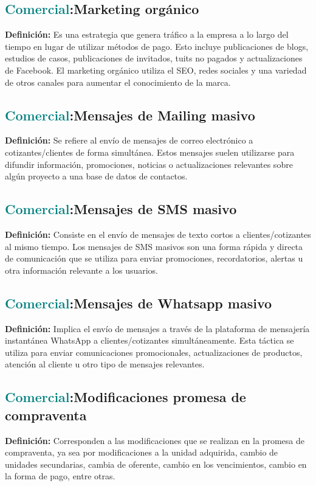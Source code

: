 \documentclass[12pt]{article}
\begin{document}
\subsection{\textcolor{teal}{Comercial}:{Marketing orgánico}}
\textbf{Definición:} Es una estrategia que genera tráfico a la empresa a lo largo del tiempo en lugar de utilizar métodos de pago. Esto incluye publicaciones de blogs, estudios de casos, publicaciones de invitados, tuits no pagados y actualizaciones de Facebook. El marketing orgánico utiliza el SEO, redes sociales y una variedad de otros canales para aumentar el conocimiento de la marca.
\subsection{\textcolor{teal}{Comercial}:{Mensajes de Mailing masivo}}
\textbf{Definición:} Se refiere al envío de mensajes de correo electrónico a cotizantes/clientes de forma simultánea. Estos mensajes suelen utilizarse para difundir información, promociones, noticias o actualizaciones relevantes sobre algún proyecto a una base de datos de contactos.
\subsection{\textcolor{teal}{Comercial}:{Mensajes de SMS masivo}}
\textbf{Definición:} Consiste en el envío de mensajes de texto cortos a clientes/cotizantes al mismo tiempo. Los mensajes de SMS masivos son una forma rápida y directa de comunicación que se utiliza para enviar promociones, recordatorios, alertas u otra información relevante a los usuarios.
\subsection{\textcolor{teal}{Comercial}:{Mensajes de Whatsapp masivo}}
\textbf{Definición:} Implica el envío de mensajes a través de la plataforma de mensajería instantánea WhatsApp a clientes/cotizantes simultáneamente. Esta táctica se utiliza para enviar comunicaciones promocionales, actualizaciones de productos, atención al cliente u otro tipo de mensajes relevantes.
\subsection{\textcolor{teal}{Comercial}:{Modificaciones promesa de compraventa}}
\textbf{Definición:} Corresponden a las modificaciones que se realizan en la promesa de compraventa, ya sea por modificaciones a la unidad adquirida, cambio de unidades secundarias, cambia de oferente, cambio en los vencimientos, cambio en la forma de pago, entre otras.
\end{document}
